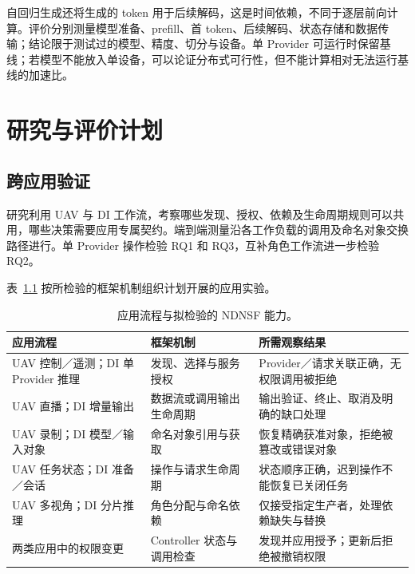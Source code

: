 自回归生成还将生成的 token 用于后续解码，这是时间依赖，不同于逐层前向计算。评价分别测量模型准备、prefill、首 token、后续解码、状态存储和数据传输；结论限于测试过的模型、精度、切分与设备。单 Provider 可运行时保留基线；若模型不能放入单设备，可以论证分布式可行性，但不能计算相对无法运行基线的加速比。



\chapter{研究与评价计划}
\label{chap:evaluation}
\label{chap:timeline}
\section{跨应用验证}
研究利用 UAV 与 DI 工作流，考察哪些发现、授权、依赖及生命周期规则可以共用，哪些决策需要应用专属契约。端到端测量沿各工作负载的调用及命名对象交换路径进行。单 Provider 操作检验 RQ1 和 RQ3，互补角色工作流进一步检验 RQ2。



表~\ref{tab:application-coverage-ch} 按所检验的框架机制组织计划开展的应用实验。

\begin{table}[H]\centering\small
\caption{应用流程与拟检验的 NDNSF 能力。}
\label{tab:application-coverage-ch}
\begin{tabularx}{\textwidth}{p{}XX}
\toprule 应用流程 & 框架机制 & 所需观察结果\\\midrule
UAV 控制／遥测；DI 单 Provider 推理 & 发现、选择与服务授权 & Provider／请求关联正确，无权限调用被拒绝\\\midrule
UAV 直播；DI 增量输出 & 数据流或调用输出生命周期 & 输出验证、终止、取消及明确的缺口处理\\\midrule
UAV 录制；DI 模型／输入对象 & 命名对象引用与获取 & 恢复精确获准对象，拒绝被篡改或错误对象\\\midrule
UAV 任务状态；DI 准备／会话 & 操作与请求生命周期 & 状态顺序正确，迟到操作不能恢复已关闭任务\\\midrule
UAV 多视角；DI 分片推理 & 角色分配与命名依赖 & 仅接受指定生产者，处理依赖缺失与替换\\\midrule
两类应用中的权限变更 & Controller 状态与调用检查 & 发现并应用授予；更新后拒绝被撤销权限\\\bottomrule
\end{tabularx}
\end{table}

